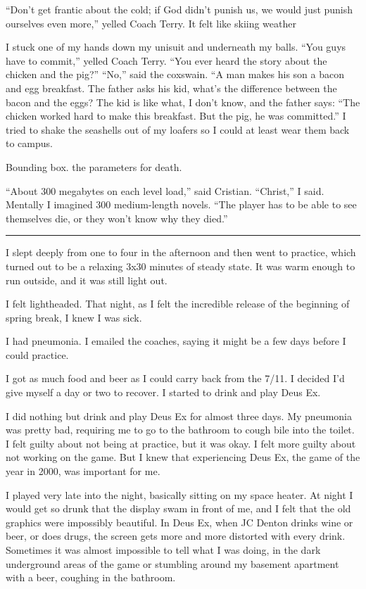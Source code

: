 ``Don't get frantic about the cold; if God didn't punish us, we would just
punish ourselves even more,'' yelled Coach Terry.  It felt like skiing weather

I stuck one of my hands down my unisuit and underneath my balls.  ``You guys
have to commit,'' yelled Coach Terry.  ``You ever heard the story about the
chicken and the pig?'' ``No,'' said the coxswain.  ``A man makes his son a bacon
and egg breakfast.  The father asks his kid, what's the difference between the
bacon and the eggs?  The kid is like what, I don't know, and the father says:
``The chicken worked hard to make this breakfast.  But the pig, he was
committed.'' I tried to shake the seashells out of my loafers so I could at
least wear them back to campus. 

Bounding box.  the parameters for death.

``About 300 megabytes on each level load,'' said Cristian.  ``Christ,'' I said.
Mentally I imagined 300 medium-length novels.  ``The player has to be able to
see themselves die, or they won't know why they died.'' 

\plainfancybreak{12pt}{2}{* * *}

I slept deeply from one to four in the afternoon and then went to practice,
which turned out to be a relaxing 3x30 minutes of steady state.  It was warm
enough to run outside, and it was still light out.

I felt lightheaded.  That night, as I felt the incredible release of the
beginning of spring break, I knew I was sick.  

I had pneumonia.  I emailed the coaches, saying it might be a few days before I
could practice.

I got as much food and beer as I could carry back from the 7/11.  I decided I'd
give myself a day or two to recover.  I started to drink and play Deus Ex.  

I did nothing but drink and play Deus Ex for almost three days.  My pneumonia
was pretty bad, requiring me to go to the bathroom to cough bile into the
toilet.  I felt guilty about not being at practice, but it was okay.  I felt
more guilty about not working on the game.  But I knew that experiencing Deus
Ex, the game of the year in 2000, was important for me.

I played very late into the night, basically sitting on my space heater.  At
night I would get so drunk that the display swam in front of me, and I felt that
the old graphics were impossibly beautiful.  In Deus Ex, when JC Denton drinks
wine or beer, or does drugs, the screen gets more and more distorted with every
drink.  Sometimes it was almost impossible to tell what I was doing, in the dark
underground areas of the game or stumbling around my basement apartment with a
beer, coughing in the bathroom.


